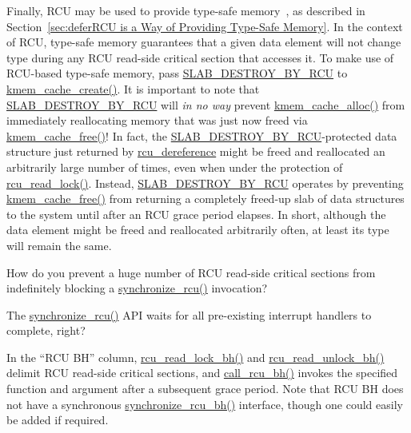 Finally, RCU may be used to provide
type-safe memory~\cite{Cheriton96a}, as described in
Section~\ref{sec:deferRCU is a Way of Providing Type-Safe Memory}.
In the context of RCU, type-safe memory guarantees that a given
data element will not change type during any RCU read-side critical section
that accesses it.
To make use of RCU-based type-safe memory, pass
\url{SLAB_DESTROY_BY_RCU} to
\url{kmem_cache_create()}.
It is important to note that \url{SLAB_DESTROY_BY_RCU} will
\emph{in no way}
prevent \url{kmem_cache_alloc()} from immediately reallocating
memory that was just now freed via \url{kmem_cache_free()}!
In fact, the \url{SLAB_DESTROY_BY_RCU}-protected data structure
just returned by \url{rcu_dereference} might be freed and reallocated
an arbitrarily large number of times, even when under the protection
of \url{rcu_read_lock()}.
Instead, \url{SLAB_DESTROY_BY_RCU} operates by preventing
\url{kmem_cache_free()}
from returning a completely freed-up slab of data structures
to the system until after an RCU grace period elapses.
In short, although the data element might be freed and reallocated arbitrarily
often, at least its type will remain the same.

\QuickQuiz{}
	How do you prevent a huge number of RCU read-side critical
	sections from indefinitely blocking a \url{synchronize_rcu()}
	invocation?
 \QuickQuizEnd

\QuickQuiz{}
	The \url{synchronize_rcu()} API waits for all pre-existing
	interrupt handlers to complete, right?
 \QuickQuizEnd

In the ``RCU BH'' column, \url{rcu_read_lock_bh()} and
\url{rcu_read_unlock_bh()} delimit RCU read-side critical
sections, and \url{call_rcu_bh()} invokes the specified
function and argument after a subsequent grace period.
Note that RCU BH does not have a synchronous \url{synchronize_rcu_bh()}
interface,
though one could easily be added if required.

